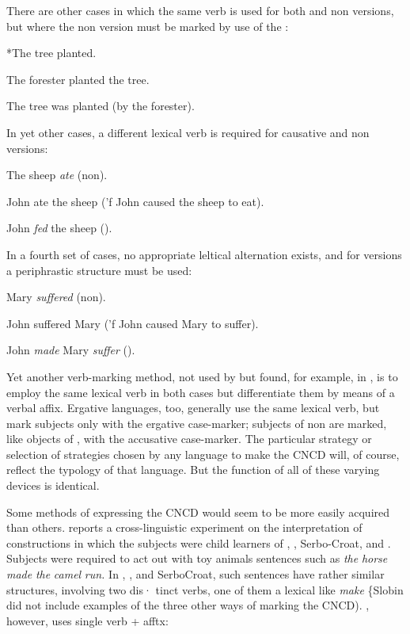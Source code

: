 There are other cases in which the same verb is used for both  and non versions, but where the non version must be marked by use of the :

\ea\label{ex:67}
 *The tree planted.
\glt
\z 


\ea\label{ex:68}
 The forester planted the tree.
\glt
\z

\ea\label{ex:69}
The tree was planted (by the forester).
\glt
\z


In yet other cases, a different lexical verb is required for causa\-tive and non versions:

\ea\label{ex:70}
 The sheep \textit{ate} (non).
\glt
\z

\ea\label{ex:71}
 John ate the sheep ('f John caused the sheep to eat).
\glt
\z

\ea\label{ex:72}
 John \textit{fed }the sheep ().
\glt
\z

In a fourth set of cases, no appropriate leltical alternation exists, and for  versions a periphrastic structure must be used:

\ea\label{ex:73}
Mary \textit{suffered} (non).
\glt
\z

\ea\label{ex:74}
John suffered Mary ('f John caused Mary to suffer).
\glt
\z


\ea\label{ex:75}
 John \textit{made} Mary \textit{suffer} ().
\glt
\z

Yet another verb-marking method, not used by  but found, for example, in , is to employ the same lexical verb in both cases but differentiate them by means of a verbal affix. Ergative languages, too, generally use the same lexical verb, but mark  subjects only with the ergative case-marker; subjects of non are marked, like objects of , with the accusative case-marker. The particular strategy or selection of strategies chosen by any lan\-guage to make the CNCD will, of course, reflect the typology of that language. But the function of all of these varying devices is identical.

Some methods of expressing the CNCD would seem to be more easily acquired than others. \citet{Slobin1978} reports a cross-linguistic experiment on the interpretation of  constructions in which the subjects were child learners of , , Serbo-Croat, and . Subjects were required to act out with toy animals sentences such as \textit{the} \textit{horse} \textit{made} \textit{the} \textit{camel} \textit{run.} In , , and Serbo\-Croat, such sentences have rather similar structures, involving two dis· tinct verbs, one of them a lexical  like \textit{make} \{Slobin did not
include examples of the three other  ways of marking the CNCD). , however, uses single verb + afftx:

